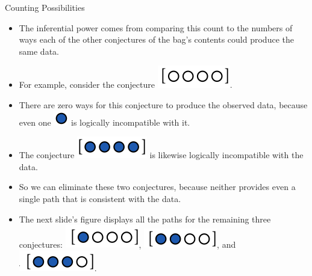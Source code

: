 \documentclass[handout]{beamer}
\begin{document}
\begin{frame}{Counting Possibilities}
\scriptsize{
\begin{itemize}
 \item The inferential power comes from comparing this count to the numbers of ways each of the other conjectures of the bag's contents could produce the same data. 
 \item For example, consider the conjecture \includegraphics[scale=0.3]{pics/marbles10.png}. 
 \item There are zero ways for this conjecture to produce the observed data, because even one \includegraphics[scale=0.3]{pics/marbles6.png} is logically incompatible with it. 
\item The conjecture \includegraphics[scale=0.3]{pics/marbles11.png} is likewise logically incompatible with the data. 
\item So we can eliminate these two conjectures, because neither provides even a single path that is consistent with the data.
\item The next slide's figure displays all the paths for the remaining three conjectures: \includegraphics[scale=0.3]{pics/marbles3.png}, \includegraphics[scale=0.3]{pics/marbles13.png}, and \includegraphics[scale=0.3]{pics/marbles14.png}.

\end{itemize}
 } 
\end{frame}
\end{document}
